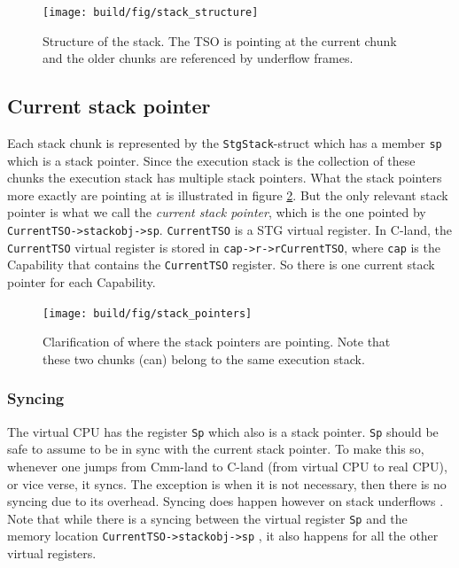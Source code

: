 \begin{figure}
\begin{mdframed}
  \texttt{[image: build/fig/stack\_structure]}
  \caption{Structure of the stack. The TSO is pointing at the current
  chunk and the older chunks are referenced by underflow frames.}
  \label{fig:stack_structure}
\end{mdframed}
\end{figure}

\subsection{Current stack pointer}

Each stack chunk is represented by the \texttt{StgStack}-struct
which has a member \texttt{sp} which is a stack pointer.
Since the execution stack is the collection of these chunks the
execution stack has multiple stack pointers. What the stack
pointers more exactly are pointing at is illustrated in figure
\ref{fig:stack_pointers}. But the only relevant stack pointer is what
we call the \emph{current stack pointer}, which is the one pointed by
\texttt{CurrentTSO->stackobj->sp}. \texttt{CurrentTSO} is a STG virtual
register. In C-land, the \texttt{CurrentTSO} virtual register is stored
in \texttt{cap->r->rCurrentTSO}, where \texttt{cap} is the Capability
that contains the \texttt{CurrentTSO} register. So there is one current
stack pointer for each Capability.

\begin{figure}
\begin{mdframed}
  \texttt{[image: build/fig/stack\_pointers]}
  \caption{Clarification of where the stack pointers are pointing. Note
that these two chunks (can) belong to the same execution stack.}
  \label{fig:stack_pointers}
\end{mdframed}
\end{figure}

\subsubsection{Syncing}

The virtual CPU has the register \texttt{Sp} which also is a stack
pointer. \texttt{Sp} should be safe to assume to be in sync with
the current stack pointer. To make this so, whenever one jumps
from Cmm-land to C-land (from virtual CPU to real CPU), or vice
verse, it syncs. The exception is when it is not necessary, then there
is no syncing due to its overhead. Syncing does happen however on stack
underflows \cite{github_underflow_frame}. Note that while there is a
syncing between the virtual register \texttt{Sp} and the memory location
\texttt{CurrentTSO->stackobj->sp} \cite{github_sync_sp}, it also happens
for all the other virtual registers.

